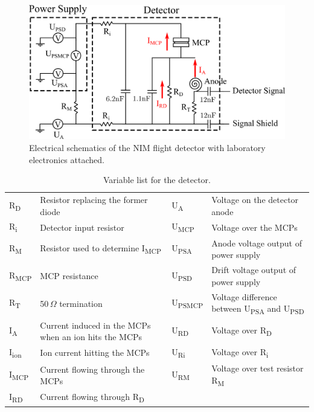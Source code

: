 		\begin{figure}[h]
			\centering
			\includegraphics[width = .8\textwidth]{Bilder/Detector_elec_schema.png}
			\caption{Electrical schematics of the NIM flight detector with laboratory electronics attached.}
			\label{fig:FlighElecSchema}
		\end{figure}
		
		
		\begin{table}[h]
			\begin{center}
			\begin{tabular}{|m{1.5cm}|m{5.4cm}|m{1.5cm}|m{5.4cm}|}
				\hline
				R\textsubscript{D}& Resistor replacing the former diode & U\textsubscript{A}& Voltage on the detector anode \\
				R\textsubscript{i} & Detector input resistor & U\textsubscript{MCP}& Voltage over the MCPs \\
				R\textsubscript{M}& Resistor used to determine I\textsubscript{MCP} &U\textsubscript{PSA} & Anode voltage output of power supply \\
				R\textsubscript{MCP}& MCP resistance & U\textsubscript{PSD} & Drift voltage output of power supply \\
				R\textsubscript{T} & 50\,$\Omega$ termination & U\textsubscript{PSMCP} & Voltage difference  between U\textsubscript{PSA} and U\textsubscript{PSD} \\
				I\textsubscript{A} & Current induced in the MCPs when an ion hits the MCPs & U\textsubscript{RD}& Voltage over R\textsubscript{D} \\
				I\textsubscript{ion} & Ion current hitting the MCPs & U\textsubscript{Ri}& Voltage over R\textsubscript{i} \\
				I\textsubscript{MCP} & Current flowing through the MCPs &U\textsubscript{RM}& Voltage over test resistor R\textsubscript{M}\\
				I\textsubscript{RD} & Current flowing through R\textsubscript{D} &&\\
				\hline
			\end{tabular}
			\end{center}
			\caption{Variable list for the detector.}
			\label{tab:ElecSchemaVariableList}
		\end{table}
	

